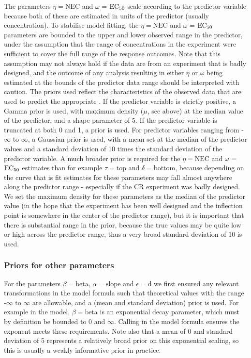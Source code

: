 \documentclass[
  shortnames]{jss}
\begin{document}
The parameters \(\eta = \text{NEC}\) and \(\omega\) = \(\text{EC\textsubscript{50}}\) scale according to the predictor variable because both of these are estimated in units of the predictor (usually concentration). To stabilise model fitting, the \(\eta = \text{NEC}\) and \(\omega\) = \(\text{EC\textsubscript{50}}\) parameters are bounded to the upper and lower observed range in the predictor, under the assumption that the range of concentrations in the experiment were sufficient to cover the full range of the response outcomes. Note that this assumption may not always hold if the data are from an experiment that is badly designed, and the outcome of any analysis resulting in either \(\eta\) or \(\omega\) being estimated at the bounds of the predictor data range should be interpreted with caution. The priors used reflect the characteristics of the observed data that are used to predict the appropriate . If the predictor variable is strictly positive, a Gamma prior is used, with maximum density (\(\mu\), see above) at the median value of the predictor, and a shape parameter of 5. If the predictor variable is truncated at both 0 and 1, a  prior is used. For predictor variables ranging from -\(\infty\) to \(\infty\), a Gaussian prior is used, with a mean set at the median of the predictor values and a standard deviation of 10 times the standard deviation of the predictor variable. A much broader prior is required for the \(\eta = \text{NEC}\) and \(\omega\) = \(\text{EC\textsubscript{50}}\) estimates than for example \(\tau = \text{top}\) and \(\delta = \text{bottom}\), because depending on the curve that is fit estimates for these parameters may fall almost anywhere along the predictor range - especially if the CR experiment was badly designed. We set the maximum density for these parameters as the median of the predictor value (in the hope that the experiment has been well designed and the inflection point is somewhere in the center of the predictor range), but it is important that there is substantial range in the prior, because the true values may be quite low or high across the predictor range, thus a very broad standard deviation of 10 is used.

\hypertarget{priors-for-other-parameters}{%
\subsubsection{Priors for other parameters}\label{priors-for-other-parameters}}

For the parameters \(\beta = \text{beta}\), \(\alpha = \text{slope}\) and \(\epsilon = \text{d}\) we first ensured any relevant transformations in the model formula such that theoretical values with the range -\(\infty\) to \(\infty\) are allowable, and a  (mean and standard deviation) prior is used. For example in the  model, \(\beta = \text{beta}\) is an exponential decay parameter, which must by definition be bounded to 0 and \(\infty\). Calling  in the model formula ensures the exponent meets these requirements. Note also that a mean of 0 and standard deviation of 5 represents a relatively broad prior on this exponential scaling, so this is usually a weakly informative prior in practice.
\end{document}
